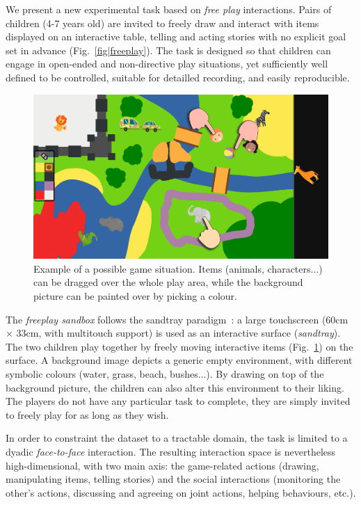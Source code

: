 \documentclass{article}
\begin{document}
We present a new experimental task based on \emph{free play} interactions. Pairs
of children (4-7 years old) are invited to freely draw and interact with items
displayed on an interactive table, telling and acting stories with no explicit
goal set in advance (Fig.~\ref{fig|freeplay}). The task is designed so that
children can engage in open-ended and non-directive play situations, yet
sufficiently well defined to be controlled, suitable for detailled recording,
and easily reproducible.

\begin{figure}[ht!]
    \centering
    \includegraphics[width=0.8\linewidth]{sandbox}
    \caption{Example of a possible game situation. Items (animals,
    characters...) can be dragged over the whole play area, while the background
    picture can be painted over by picking a colour.}

    \label{fig|sandbox}
\end{figure}

The \emph{freeplay sandbox} follows the sandtray
paradigm~\cite{baxter2012touchscreen}: a large touchscreen (60cm $\times$ 33cm,
with multitouch support) is used as an interactive surface (\emph{sandtray}). The two children play together
by freely moving interactive items (Fig.~\ref{fig|sandbox}) on the surface. A background image
depicts a generic empty environment, with different symbolic colours (water,
grass, beach, bushes...). By drawing on top of the background picture, the
children can also alter this environment to their liking. The players do not have any particular task to
complete, they are simply invited to freely play for as long as they wish.

In order to constraint the dataset to a tractable domain, the task is limited to
a dyadic \emph{face-to-face} interaction.  The resulting interaction space is
nevertheless high-dimensional, with two main axis: the game-related actions
(drawing, manipulating items, telling stories) and the social interactions
(monitoring the other's actions, discussing and agreeing on joint actions,
helping behaviours, etc.).
\end{document}
